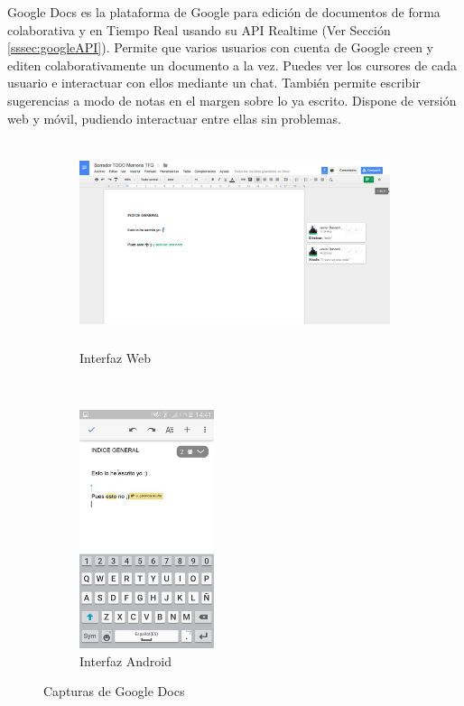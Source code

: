 	Google Docs \cite{ref:google_docs} es la plataforma de Google para edición de documentos de forma colaborativa y en Tiempo Real usando su API Realtime (Ver Sección \ref{sssec:googleAPI}). Permite que varios usuarios con cuenta de Google creen y editen colaborativamente un documento a la vez. Puedes ver los cursores de cada usuario e interactuar con ellos mediante un chat. También permite escribir sugerencias a modo de notas en el margen sobre lo ya escrito. Dispone de versión web y móvil, pudiendo interactuar entre ellas sin problemas.
	
	\begin{figure}[H]
        \centering
        \begin{subfigure}[b]{0.6\textwidth}
                \includegraphics[width=\textwidth, height=6cm]{Media/Captures/googleDocsWeb.png}
                \caption{Interfaz Web}
                \label{fig:googleDocsWeb}
        \end{subfigure}
        ~
        \begin{subfigure}[b]{0.3\textwidth}
                \includegraphics[width=\textwidth, height=7cm]{Media/Captures/googleDocsApp.jpg}
                \caption{Interfaz Android}
                \label{fig:googleDocsApp}
        \end{subfigure}
        \caption{Capturas de Google Docs}\label{fig:googleDocsCaptures}
	\end{figure}
	
